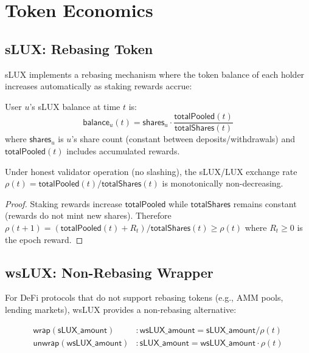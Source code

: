 \section{Token Economics}
\label{sec:tokens}

\subsection{sLUX: Rebasing Token}

sLUX implements a rebasing mechanism where the token balance of each holder increases automatically as staking rewards accrue:

\begin{definition}
User $u$'s sLUX balance at time $t$ is:
\begin{equation}
    \mathsf{balance}_u(t) = \mathsf{shares}_u \cdot \frac{\mathsf{totalPooled}(t)}{\mathsf{totalShares}(t)}
\end{equation}
where $\mathsf{shares}_u$ is $u$'s share count (constant between deposits/withdrawals) and $\mathsf{totalPooled}(t)$ includes accumulated rewards.
\end{definition}

\begin{proposition}
Under honest validator operation (no slashing), the sLUX/LUX exchange rate $\rho(t) = \mathsf{totalPooled}(t) / \mathsf{totalShares}(t)$ is monotonically non-decreasing.
\end{proposition}

\begin{proof}
Staking rewards increase $\mathsf{totalPooled}$ while $\mathsf{totalShares}$ remains constant (rewards do not mint new shares). Therefore $\rho(t+1) = (\mathsf{totalPooled}(t) + R_t) / \mathsf{totalShares}(t) \geq \rho(t)$ where $R_t \geq 0$ is the epoch reward.
\end{proof}

\subsection{wsLUX: Non-Rebasing Wrapper}

For DeFi protocols that do not support rebasing tokens (e.g., AMM pools, lending markets), wsLUX provides a non-rebasing alternative:

\begin{definition}
\begin{align}
    \mathsf{wrap}(\mathsf{sLUX\_amount}) &: \mathsf{wsLUX\_amount} = \mathsf{sLUX\_amount} / \rho(t) \\
    \mathsf{unwrap}(\mathsf{wsLUX\_amount}) &: \mathsf{sLUX\_amount} = \mathsf{wsLUX\_amount} \cdot \rho(t)
\end{align}
\end{definition}

